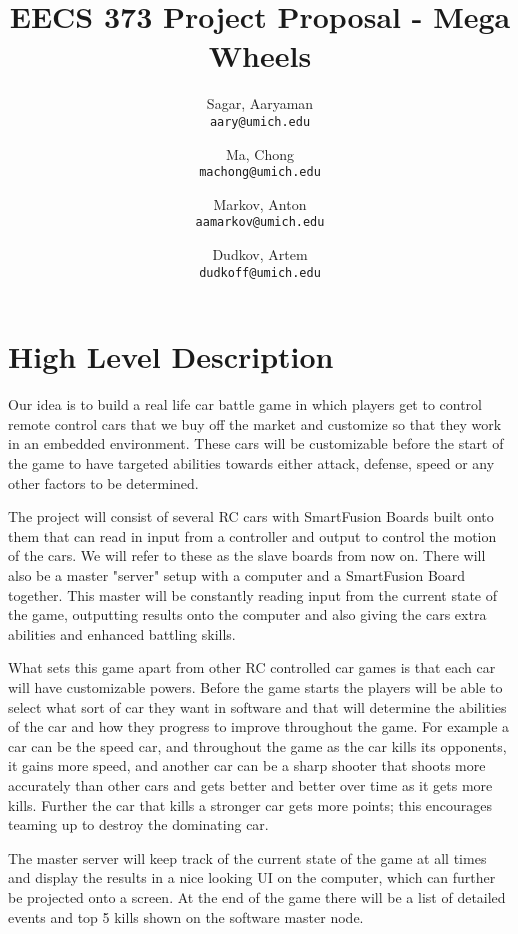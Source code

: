 \documentclass{article}
\begin{document}
\title{\textbf{EECS 373 Project Proposal - Mega Wheels}}
\author{
  Sagar, Aaryaman\\
  \texttt{aary@umich.edu}
  \and
  Ma, Chong\\
  \texttt{machong@umich.edu}
  \and 
  Markov, Anton\\
  \texttt{aamarkov@umich.edu}
  \and
  Dudkov, Artem\\
  \texttt{dudkoff@umich.edu}
}
\date{}
\maketitle

\section{High Level Description} Our idea is to build a real life car battle
game in which players get to control remote control cars that we buy off the
market and customize so that they work in an embedded environment.  These cars
will be customizable before the start of the game to have targeted abilities
towards either attack, defense, speed or any other factors to be determined. 

The project will consist of several RC cars with SmartFusion Boards built onto
them that can read in input from a controller and output to control the motion
of the cars.  We will refer to these as the slave boards from now on.  There
will also be a master "server" setup with a computer and a SmartFusion Board
together.  This master will be constantly reading input from the current state
of the game, outputting results onto the computer and also giving the cars
extra abilities and enhanced battling skills.

What sets this game apart from other RC controlled car games is that each car
will have customizable powers.  Before the game starts the players will be
able to select what sort of car they want in software and that will determine
the abilities of the car and how they progress to improve throughout the game.
For example a car can be the speed car, and throughout the game as the car
kills its opponents, it gains more speed, and another car can be a sharp
shooter that shoots more accurately than other cars and gets better and better
over time as it gets more kills.  Further the car that kills a stronger car
gets more points; this encourages teaming up to destroy the dominating car. 

The master server will keep track of the current state of the game at all
times and display the results in a nice looking UI on the computer, which can
further be projected onto a screen.  At the end of the game there will be a
list of detailed events and top 5 kills shown on the software master node.
\end{document}
